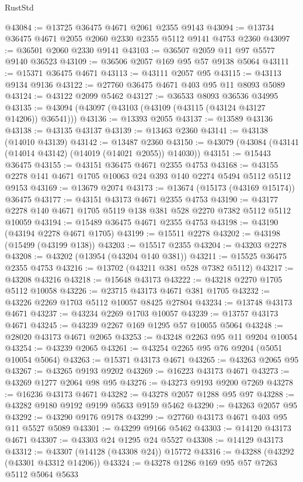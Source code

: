 \begin{lexlean}{RustStd}
\begin{coremodule}
@43084 := @13725 @36475 @4671 @2061 @2355 @9143
@43094 := @13734 @36475 @4671 @2055 @2060 @2330 @2355 @5112 @9141 @4753 @2360
@43097 := @36501 @2060 @2330 @9141
@43103 := @36507 @2059 @11 @97 @5577 @9140 @36523
@43109 := @36506 @2057 @169 @95 @57 @9138 @5064
@43111 := @15371 @36475 @4671
@43113 := @43111 @2057 @95
@43115 := @43113 @9134 @9136
@43122 := @27760 @36475 @4671 @403 @95 @11 @8093 @5089
@43124 := @43122 @2099 @5462
@43127 := @36533 @8093 @36536 @34995
@43135 := @43094 (@43097 (@43103 (@43109 (@43115 (@43124 @43127 @14206)) @36541)))
@43136 := @13393 @2055
@43137 := @13589 @43136
@43138 := @43135 @43137
@43139 := @13463 @2360
@43141 := @43138 (@14010 @43139)
@43142 := @13487 @2360
@43150 := @43079 (@43084 (@43141 (@14014 @43142) (@14019 (@14021 @2055)) @14030))
@43151 := @15443 @36475
@43155 := @43151 @36475 @4671 @2355 @4753
@43168 := @43155 @2278 @141 @4671 @1705 @10063 @24 @393 @140 @2274 @5494 @5112 @5112 @9153
@43169 := @13679 @2074
@43173 := @13674 (@15173 (@43169 @15174)) @36475
@43177 := @43151 @43173 @4671 @2355 @4753
@43190 := @43177 @2278 @140 @4671 @1705 @5119 @138 @381 @528 @2270 @7382 @5112 @5112 @10059
@43194 := @15489 @36475 @4671 @2355 @4753
@43198 := @43190 (@43194 @2278 @4671 @1705)
@43199 := @15511 @2278
@43202 := @43198 (@15499 (@43199 @138))
@43203 := @15517 @2355
@43204 := @43203 @2278
@43208 := @43202 (@13954 (@43204 @140 @381))
@43211 := @15525 @36475 @2355 @4753
@43216 := @13702 (@43211 @381 @528 @7382 @5112)
@43217 := @43208 @43216
@43218 := @15648 @43173
@43222 := @43218 @2270 @1705 @5112 @10058
@43226 := @23715 @43173 @4671 @381 @1705
@43232 := @43226 @2269 @1703 @5112 @10057 @8425 @27804
@43234 := @13748 @43173 @4671
@43237 := @43234 @2269 @1703 @10057
@43239 := @13757 @43173 @4671
@43245 := @43239 @2267 @169 @1295 @57 @10055 @5064
@43248 := @28020 @43173 @4671 @2065
@43253 := @43248 @2263 @95 @11 @9204 @10054
@43254 := @43239 @2065
@43261 := @43254 @2265 @95 @76 @9204 (@5051 @10054 @5064)
@43263 := @15371 @43173 @4671
@43265 := @43263 @2065 @95
@43267 := @43265 @9193 @9202
@43269 := @16223 @43173 @4671
@43273 := @43269 @1277 @2064 @98 @95
@43276 := @43273 @9193 @9200 @7269
@43278 := @16236 @43173 @4671
@43282 := @43278 @2057 @1288 @95 @97
@43288 := @43282 @9180 @9192 @9199 @5633 @9159 @5462
@43290 := @43263 @2057 @95
@43292 := @43290 @9176 @9178
@43299 := @27760 @43173 @4671 @403 @95 @11 @5527 @5089
@43301 := @43299 @9166 @5462
@43303 := @14120 @43173 @4671
@43307 := @43303 @24 @1295 @24 @5527
@43308 := @14129 @43173
@43312 := @43307 (@14128 (@43308 @24)) @15772
@43316 := @43288 (@43292 (@43301 @43312 @14206))
@43324 := @43278 @1286 @169 @95 @57 @7263 @5112 @5064 @5633

\end{coremodule}
\end{lexlean}
